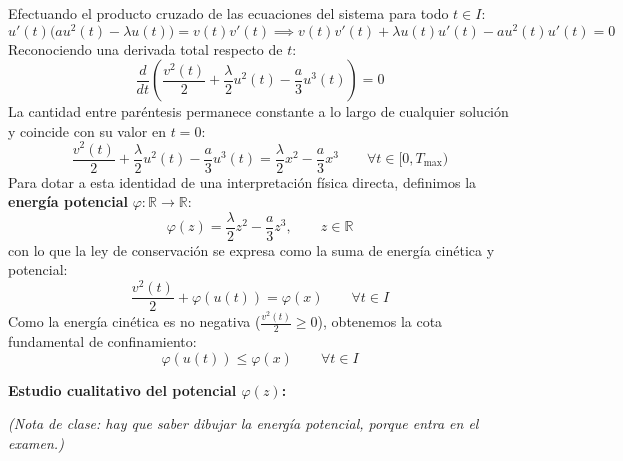 {    Efectuando el producto cruzado de las ecuaciones del sistema para todo $t \in I$:
    \[
        u'(t)\bigl(a u^2(t) - \lambda u(t)\bigr) = v(t) v'(t) \implies v(t) v'(t) + \lambda u(t) u'(t) - a u^2(t) u'(t) = 0
    \]
    Reconociendo una derivada total respecto de $t$:
    \[
        \frac{d}{dt} \left( \frac{v^2(t)}{2} + \frac{\lambda}{2} u^2(t) - \frac{a}{3} u^3(t) \right) = 0
    \]
    La cantidad entre paréntesis permanece constante a lo largo de cualquier solución y coincide con su valor en $t = 0$:
    \[
        \frac{v^2(t)}{2} + \frac{\lambda}{2} u^2(t) - \frac{a}{3} u^3(t) = \frac{\lambda}{2} x^2 - \frac{a}{3} x^3 \qquad \forall t \in [0, T_{\max})
    \]
    Para dotar a esta identidad de una interpretación física directa, definimos la \textbf{energía potencial} $\varphi: \mathbb{R} \to \mathbb{R}$:
    \[
        \varphi(z) = \frac{\lambda}{2} z^2 - \frac{a}{3} z^3, \qquad z \in \mathbb{R}
    \]
    con lo que la ley de conservación se expresa como la suma de energía cinética y potencial:
    \[
        \frac{v^2(t)}{2} + \varphi(u(t)) = \varphi(x) \qquad \forall t \in I
    \]
    Como la energía cinética es no negativa ($\frac{v^2(t)}{2} \geq 0$), obtenemos la cota fundamental de confinamiento:
    \[
        \varphi(u(t)) \leq \varphi(x) \qquad \forall t \in I
    \]

    \medskip

    \textbf{Estudio cualitativo del potencial $\varphi(z)$:}

    \textit{(Nota de clase: hay que saber dibujar la energía potencial, porque entra en el examen.)}

}
